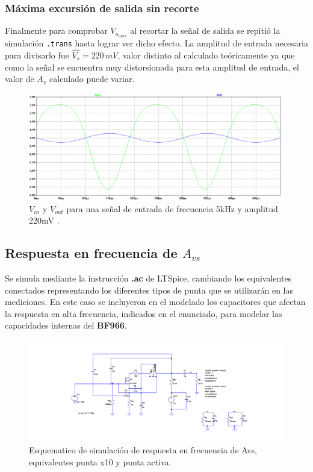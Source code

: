 \documentclass[10pt,spanish,a4paper,notitlepage]{article}
\begin{document}
\subsubsection{Máxima excursión de salida sin recorte}

Finalmente para comprobar $V_{o_{max}}$ al recortar la señal de salida se repitió la simulación \texttt{.trans} hasta lograr ver dicho efecto. La amplitud de entrada necesaria para divisarlo fue $\widehat{V_s}=220\,\unit{mV}$, valor distinto al calculado teóricamente ya que como la señal se encuentra muy distorsionada para esta amplitud de entrada, el valor de $A_v$ calculado puede variar.

\begin{figure}[H]
\centering
\includegraphics[scale=0.45]{senales/simulacion-vomax-recorte.png}
\caption{$V_{in}$ y $V_{out}$  para una señal de entrada de frecuencia  5\unit{kHz}  y  amplitud  220\unit{mV} .}
\label{fig:SIMUmax_corte}
\end{figure}





\subsection{Respuesta en frecuencia de  \texorpdfstring{$A_{vs}$}{TEXT}}

Se simula mediante la instrucción \textbf{.ac} de LTSpice, cambiando los equivalentes conectados representando los diferentes tipos de punta que se utilizarán en las mediciones. En este caso se incluyeron en el modelado los capacitores que afectan la respuesta en alta frecuencia, indicados en el enunciado, para modelar las capacidades internas del \textbf{BF966}.

\begin{figure}[H]
\centering
\includegraphics[scale=0.45]{circuitos/Esquematico-sim-Avs-rta-frec.png}
\caption{Esquematico de simulación de respuesta en frecuencia de Avs, equivalentes punta x10 y punta activa.}
\label{fig:EsquemAvs_rta_frec}
\end{figure}
\end{document}
